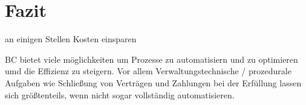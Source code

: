 \section{Fazit}

an einigen Stellen Kosten einsparen

BC bietet viele möglichkeiten um Prozesse zu automatisiern und zu optimieren umd die Effizienz zu steigern.
Vor allem Verwaltungstechnische / prozedurale Aufgaben wie Schließung von Verträgen und Zahlungen bei der
Erfüllung lassen sich größtenteils, wenn nicht sogar vollständig automatisieren.